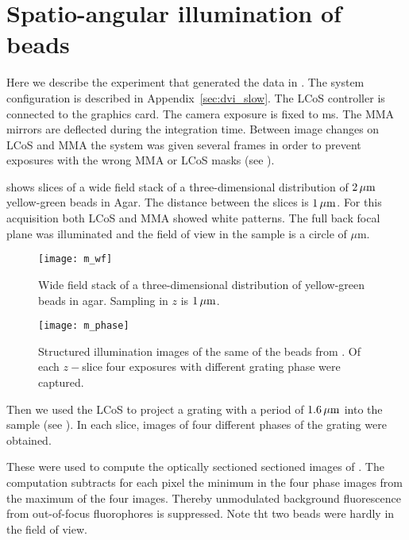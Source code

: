 \section{Spatio-angular illumination of beads}
Here we describe the experiment that generated the data in
. The system configuration is
described in Appendix~\ref{sec:dvi_slow}. The LCoS controller is
connected to the graphics card. The camera exposure is fixed to
\unit[16]{ms}. The MMA mirrors are deflected during the integration
time. Between image changes on LCoS and MMA the system was given
several frames in order to prevent exposures with the wrong MMA or
LCoS masks (see ).

 shows slices of a wide field stack of a
three-dimensional distribution of $\unit[2]{\mu m}$ yellow-green beads
in Agar. The distance between the slices is $\unit[1]{\mu m}$. For
this acquisition both LCoS and MMA showed white patterns. The full
back focal plane was illuminated and the field of view in the sample
is a circle of \unit[25]{$\mu$m}.

\begin{figure}[H]
  \centering
  \texttt{[image: m\_wf]}
  \caption{Wide field stack of a three-dimensional distribution of
    yellow-green beads in agar. Sampling in $z$ is $\unit[1]{\mu m}$.}
  \label{fig:m_wf}
\end{figure}

\begin{figure}[H]
  \centering
  \texttt{[image: m\_phase]}
  \caption{Structured illumination images of the same of the beads
    from . Of each $z-$slice four exposures with
    different grating phase were captured.}
  \label{fig:m_phase}
\end{figure}



Then we used the LCoS to project a grating with a period of
$\unit[1.6]{\mu m}$ into the sample (see ). In
each slice, images of four different phases of the grating were
obtained. 

These were used to compute the optically sectioned sectioned images of
. The computation subtracts for each pixel the
minimum in the four phase images from the maximum of the four
images. Thereby unmodulated background fluorescence from out-of-focus
fluorophores is suppressed. Note tht two beads were hardly in the
field of view.

